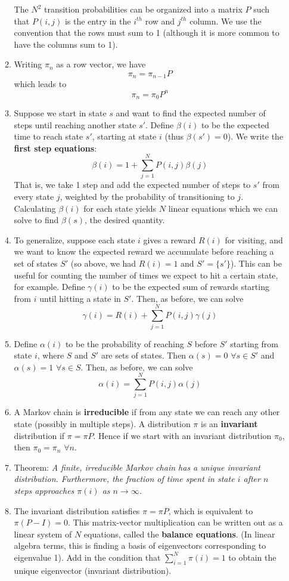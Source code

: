 \documentclass[10pt]{article}
\begin{document}
\begin{multicols}{2}
\begin{enumerate}
\begin{enumerate}
            The $N^2$ transition probabilities can be organized into a matrix $P$ such that $P(i,j)$ is the entry in the $i^{th}$ row and $j^{th}$ column. We use the convention that the rows must sum to 1 (although it is more common to have the columns sum to 1).
            \item Writing $\pi_n$ as a row vector, we have $$\pi_n = \pi_{n-1}P$$ which leads to
            $$\pi_n = \pi_0P^n$$
            \item Suppose we start in state $s$ and want to find the expected number of steps until reaching another state $s'$. Define $\beta(i)$ to be the expected time to reach state $s'$, starting at state $i$ (thus $\beta(s')=0$). We write the \textbf{first step equations}: $$\beta(i) = 1 + \sum_{j=1}^N P(i,j)\beta(j)$$ That is, we take 1 step and add the expected number of steps to $s'$ from every state $j$, weighted by the probability of transitioning to $j$. Calculating $\beta(i)$ for each state yields $N$ linear equations which we can solve to find $\beta(s)$, the desired quantity.
            \item To generalize, suppose each state $i$ gives a reward $R(i)$ for visiting, and we want to know the expected reward we accumulate before reaching a set of states $S'$ (so above, we had $R(i)=1$ and $S' = \{s'\}$). This can be useful for counting the number of times we expect to hit a certain state, for example. Define $\gamma(i)$ to be the expected sum of rewards starting from $i$ until hitting a state in $S'$. Then, as before, we can solve $$\gamma(i)=R(i) + \sum_{j=1}^N P(i,j)\gamma(j)$$
            \item Define $\alpha(i)$ to be the probability of reaching $S$ before $S'$ starting from state $i$, where $S$ and $S'$ are sets of states. Then $\alpha(s)=0$ $\forall s \in S'$ and $\alpha(s)=1$ $\forall s \in S$. Then, as before, we can solve $$\alpha(i) = \sum_{j=1}^N P(i,j)\alpha(j)$$
            \item A Markov chain is \textbf{irreducible} if from any state we can reach any other state (possibly in multiple steps). A distribution $\pi$ is an \textbf{invariant} distribution if $\pi = \pi P$. Hence if we start with an invariant distribution $\pi_0$, then $\pi_0 = \pi_n$ $\forall n$.
            \item Theorem: \textit{A finite, irreducible Markov chain has a unique invariant distribution. Furthermore, the fraction of time spent in state $i$ after $n$ steps approaches $\pi(i)$ as $n\rightarrow \infty$.}
            \item The invariant distribution satisfies $\pi = \pi P$, which is equivalent to $\pi(P-I)=0$. This matrix-vector multiplication can be written out as a linear system of $N$ equations, called the \textbf{balance equations}. (In linear algebra terms, this is finding a basis of eigenvectors corresponding to eigenvalue 1). Add in the condition that $\sum_{i=1}^N \pi(i) = 1$ to obtain the unique eigenvector (invariant distribution).

\end{enumerate}
\end{enumerate}
\end{multicols}
\end{document}
